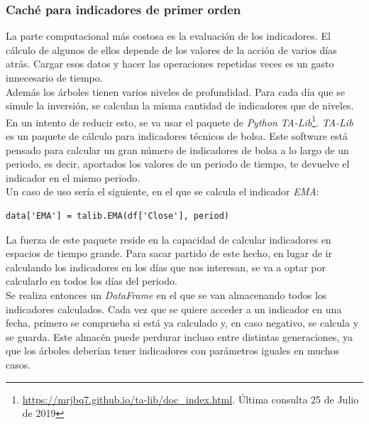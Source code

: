 \subsubsection{Cach\'e para indicadores de primer orden}
La parte computacional m\'as costosa es la evaluaci\'on de los indicadores. El c\'alculo de algunos de ellos depende de los valores de la acci\'on de varios d\'ias atr\'as. Cargar esos datos y hacer las operaciones repetidas veces es un gasto innecesario de tiempo.\\

Adem\'as los \'arboles tienen varios niveles de profundidad. Para cada d\'ia que se simule la inversi\'on, se calculan la misma cantidad de indicadores que de niveles.\\

En un intento de reducir esto, se va usar el paquete de \textit{Python} \textit{TA-Lib}\footnote{\url{https://mrjbq7.github.io/ta-lib/doc_index.html}. \'Ultima consulta 25 de Julio de 2019}.
\textit{TA-Lib} es un paquete de c\'alculo para indicadores t\'ecnicos de bolsa. Este software est\'a pensado para calcular un gran n\'umero de indicadores de bolsa a lo largo de un periodo, es decir, aportados los valores de un periodo de tiempo, te devuelve el indicador en el mismo periodo.\\

Un caso de uso ser\'ia el siguiente, en el que se calcula el indicador \textit{EMA}:\\

\begin{lstlisting}
data['EMA'] = talib.EMA(df['Close'], period)
\end{lstlisting}

La fuerza de este paquete reside en la capacidad de calcular indicadores en espacios de tiempo grande. Para sacar partido de este hecho, en lugar de ir calculando los indicadores en los d\'ias que nos interesan, se va a optar por calcularlo en todos los d\'ias del periodo.\\

Se realiza entonces un \textit{DataFrame} en el que se van almacenando todos los indicadores calculados. Cada vez que se quiere acceder a un indicador en una fecha, primero se comprueba si est\'a ya calculado y, en caso negativo, se calcula y se guarda. Este almac\'en puede perdurar incluso entre distintas generaciones, ya que los \'arboles deber\'ian tener indicadores con par\'ametros iguales en muchos casos.\\ 

